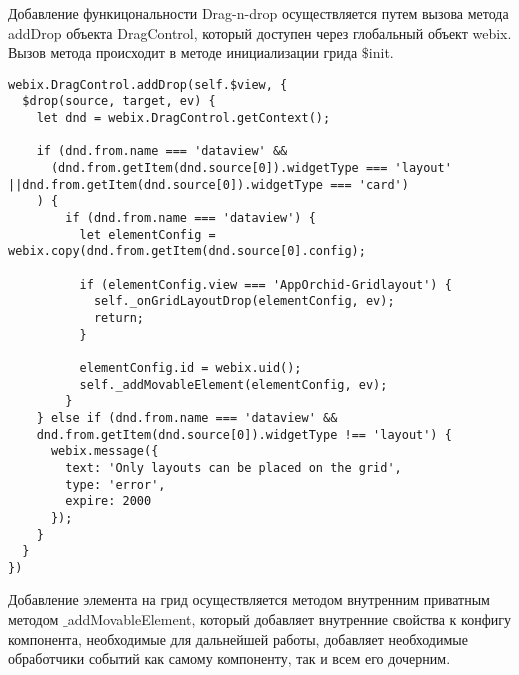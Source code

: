 Добавление функицональности Drag-n-drop осуществляется путем вызова метода addDrop объекта DragControl, который доступен через глобальный объект webix.
Вызов метода происходит в методе инициализации грида $\$$init.

\begin{lstlisting}
webix.DragControl.addDrop(self.$view, {
  $drop(source, target, ev) {
    let dnd = webix.DragControl.getContext();

    if (dnd.from.name === 'dataview' &&
      (dnd.from.getItem(dnd.source[0]).widgetType === 'layout' ||dnd.from.getItem(dnd.source[0]).widgetType === 'card')
    ) {
        if (dnd.from.name === 'dataview') {
          let elementConfig = webix.copy(dnd.from.getItem(dnd.source[0].config);

          if (elementConfig.view === 'AppOrchid-Gridlayout') {
            self._onGridLayoutDrop(elementConfig, ev);
            return;
          }

          elementConfig.id = webix.uid();
          self._addMovableElement(elementConfig, ev);
        }
    } else if (dnd.from.name === 'dataview' && 
    dnd.from.getItem(dnd.source[0]).widgetType !== 'layout') {
      webix.message({
        text: 'Only layouts can be placed on the grid',
        type: 'error',
        expire: 2000
      });
    }
  }
})
\end{lstlisting}

Добавление элемента на грид осуществляется методом внутренним приватным методом $\_$addMovableElement, который добавляет внутренние свойства к конфигу компонента, необходимые для дальнейшей работы, добавляет необходимые обработчики событий как самому компоненту, так и всем его дочерним.

